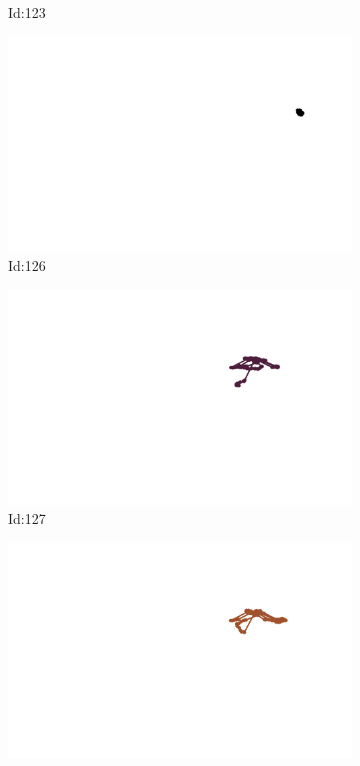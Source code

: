 \documentclass[12pt,twoside]{report}
\begin{document}
\begin{figure}
\begin{subfigure}[b]{0.20\textwidth}
\caption{Id:123}
\end{subfigure}
\begin{subfigure}[b]{0.20\textwidth}
\centering
\includegraphics[width=\textwidth]{../trajectories/126.png}
\caption{Id:126}
\end{subfigure}
\begin{subfigure}[b]{0.20\textwidth}
\centering
\includegraphics[width=\textwidth]{../trajectories/127.png}
\caption{Id:127}
\end{subfigure}
\begin{subfigure}[b]{0.20\textwidth}
\centering
\includegraphics[width=\textwidth]{../trajectories/128.png}

\end{subfigure}
\end{figure}
\end{document}
